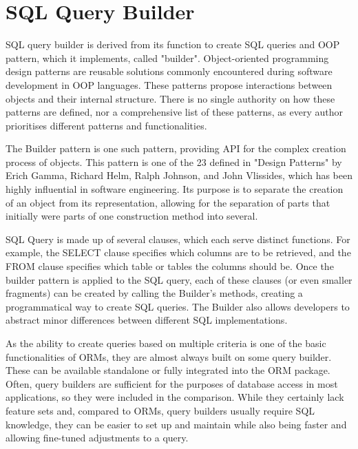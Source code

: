\section{SQL Query Builder}
SQL query builder is derived from its function to create SQL queries and OOP pattern, which it implements, called "builder". Object-oriented programming design patterns are reusable solutions commonly encountered during software development in OOP languages. These patterns propose interactions between objects and their internal structure. There is no single authority on how these patterns are defined, nor a comprehensive list of these patterns, as every author prioritises different patterns and functionalities. \par
The Builder pattern is one such pattern, providing API for the complex creation process of objects. This pattern is one of the 23 defined in "Design Patterns" by Erich Gamma, Richard Helm, Ralph Johnson, and John Vlissides, which has been highly influential in software engineering. Its purpose is to separate the creation of an object from its representation, allowing for the separation of parts that initially were parts of one construction method into several.\par
SQL Query is made up of several clauses, which each serve distinct functions. For example, the SELECT clause specifies which columns are to be retrieved, and the FROM clause specifies which table or tables the columns should be. Once the builder pattern is applied to the SQL query, each of these clauses (or even smaller fragments) can be created by calling the Builder's methods, creating a programmatical way to create SQL queries. The Builder also allows developers to abstract minor differences between different SQL implementations.\par
As the ability to create queries based on multiple criteria is one of the basic functionalities of ORMs, they are almost always built on some query builder. These can be available standalone or fully integrated into the ORM package. Often, query builders are sufficient for the purposes of database access in most applications, so they were included in the comparison. While they certainly lack feature sets and, compared to ORMs, query builders usually require SQL knowledge, they can be easier to set up and maintain while also being faster and allowing fine-tuned adjustments to a query. \par

